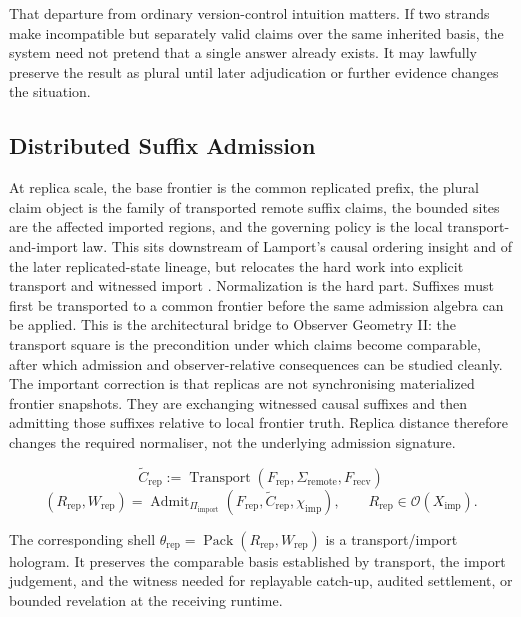 \documentclass[11pt]{article}
\theoremstyle{definition}
\theoremstyle{plain}
\theoremstyle{remark}
\begin{document}
That departure from ordinary version-control intuition matters. If two strands make incompatible but separately valid claims over the same inherited basis, the system need not pretend that a single answer already exists. It may lawfully preserve the result as plural until later adjudication or further evidence changes the situation.

\subsection{Distributed Suffix Admission}

At replica scale, the base frontier is the common replicated prefix, the plural claim object is the family of transported remote suffix claims, the bounded sites are the affected imported regions, and the governing policy is the local transport-and-import law. This sits downstream of Lamport's causal ordering insight and of the later replicated-state lineage, but relocates the hard work into explicit transport and witnessed import \cite{lamport1978time,decandia2007dynamo,shapiro2011crdt}. Normalization is the hard part. Suffixes must first be transported to a common frontier before the same admission algebra can be applied. This is the architectural bridge to Observer Geometry II: the transport square is the precondition under which claims become comparable, after which admission and observer-relative consequences can be studied cleanly. The important correction is that replicas are not synchronising materialized frontier snapshots. They are exchanging witnessed causal suffixes and then admitting those suffixes relative to local frontier truth. Replica distance therefore changes the required normaliser, not the underlying admission signature.

\[
\widetilde{C}_{\mathrm{rep}}
:=
\operatorname{Transport}(F_{\mathrm{rep}}, \Sigma_{\mathrm{remote}}, F_{\mathrm{recv}})
\]
\[
(R_{\mathrm{rep}}, W_{\mathrm{rep}})
=
\operatorname{Admit}_{\Pi_{\mathrm{import}}}
(F_{\mathrm{rep}}, \widetilde{C}_{\mathrm{rep}}, \chi_{\mathrm{imp}}),
\qquad
R_{\mathrm{rep}} \in \mathcal{O}(X_{\mathrm{imp}}).
\]

The corresponding shell
\(\theta_{\mathrm{rep}} = \operatorname{Pack}(R_{\mathrm{rep}}, W_{\mathrm{rep}})\)
is a transport/import hologram. It preserves the comparable basis established
by transport, the import judgement, and the witness needed for replayable
catch-up, audited settlement, or bounded revelation at the receiving runtime.
\end{document}
